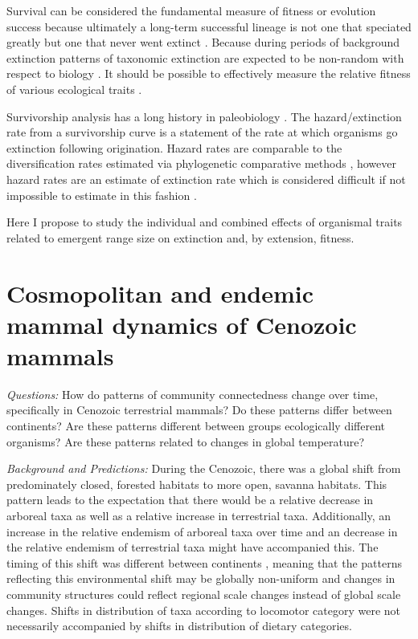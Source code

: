 \documentclass[12pt,letterpaper]{article}
\begin{document}
Survival can be considered the fundamental measure of fitness or evolution success \citep{Cooper1984,Palmer2012} because ultimately a long-term successful lineage is not one that speciated greatly but one that never went extinct \citep{Palmer2012}. Because during periods of background extinction patterns of taxonomic extinction are expected to be non-random with respect to biology \citep{Jablonski1986}. It should be possible to effectively measure the relative fitness of various ecological traits \citep{Kitchell1990,Kitchell1985a}. 

Survivorship analysis has a long history in paleobiology \citep{Simpson1944,VanValen1979,Foote1988,Baumiller1993,Kitchell1987b,Kitchell1990,Simpson1953,Raup1991a,Simpson2006}. The hazard/extinction rate from a survivorship curve is a statement of the rate at which organisms go extinction following origination. Hazard rates are comparable to the diversification rates estimated via phylogenetic comparative methods \citep{Fitzjohn2010,Maddison2007,Rabosky2013,Nee2001,Nee1994d,Nee1992}, however hazard rates are an estimate of extinction rate which is considered difficult if not impossible to estimate in this fashion \citep{Rabosky2010a}.

Here I propose to study the individual and combined effects of organismal traits related to emergent range size on extinction and, by extension, fitness.


\section{Cosmopolitan and endemic mammal dynamics of Cenozoic mammals}

\textit{Questions:} How do patterns of community connectedness change over time, specifically in Cenozoic terrestrial mammals? Do these patterns differ between continents? Are these patterns different between groups ecologically different organisms? Are these patterns related to changes in global temperature?

\textit{Background and Predictions:}
During the Cenozoic, there was a global shift from predominately closed, forested habitats to more open, savanna habitats. This pattern leads to the expectation that there would be a relative decrease in arboreal taxa as well as a relative increase in terrestrial taxa. Additionally, an increase in the relative endemism of arboreal taxa over time and an decrease in the relative endemism of terrestrial taxa might have accompanied this. The timing of this shift was different between continents \citep{Stromberg2005,Stromberg2013}, meaning that the patterns reflecting this environmental shift may be globally non-uniform and changes in community structures could reflect regional scale changes instead of global scale changes. Shifts in distribution of taxa according to locomotor category were not necessarily accompanied by shifts in distribution of dietary categories.
\end{document}
